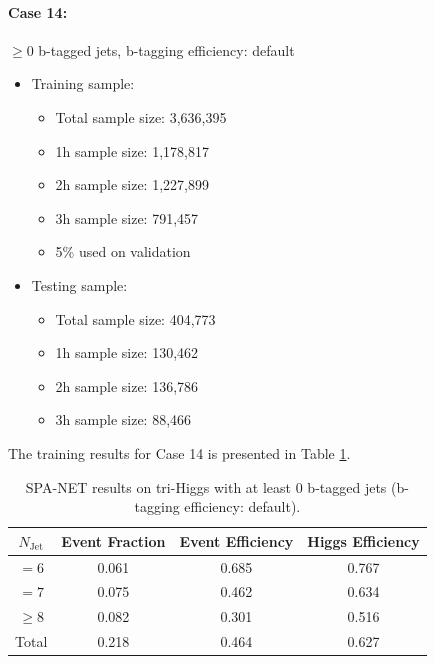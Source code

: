 \documentclass[12pt]{article}
\begin{document}
		\paragraph{Case 14:} $\ge 0$ b-tagged jets, b-tagging efficiency: default
		\begin{itemize}
			\item Training sample:
			\begin{itemize}
				\item Total sample size: 3,636,395
				\item 1h sample size: 1,178,817
				\item 2h sample size: 1,227,899
				\item 3h sample size: 791,457
				\item 5\% used on validation
			\end{itemize}
			\item Testing sample: 
				\begin{itemize}
					\item Total sample size: 404,773
					\item 1h sample size: 130,462
					\item 2h sample size: 136,786
					\item 3h sample size: 88,466
				\end{itemize}
		\end{itemize}
		The training results for Case 14 is presented in Table \ref{tab:SPANet_triHiggs_0btag_default_7M}.
		\begin{table}[htpb]
			\centering
			\caption{SPA-NET results on tri-Higgs with at least 0 b-tagged jets (b-tagging efficiency: default).}
			\label{tab:SPANet_triHiggs_0btag_default_7M}
			\begin{tabular}{c|c|cc}
				$N_\text{Jet}$ & Event Fraction & Event Efficiency & Higgs Efficiency \\
				\hline
				$=6$	  &   0.061             &    0.685              &    0.767             \\
				$=7$	  &   0.075             &    0.462              &    0.634             \\
				$\ge 8$	  &   0.082             &    0.301              &    0.516             \\
				Total	  &   0.218             &    0.464              &    0.627             \\
			\end{tabular}
		\end{table}
\end{document}
